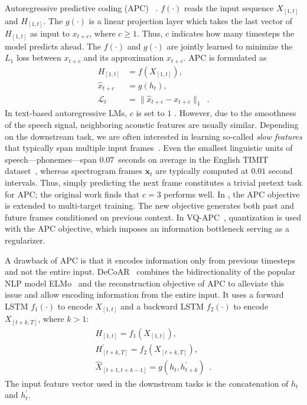 Autoregressive predictive coding (APC)~\cite{chung_unsupervised_2019,
chung_generative_2020} .
 $f(\cdot)$ reads the input sequence $X_{[1,t]}$ and  $H_{[1,t]}$.
The  $g(\cdot)$ is a linear projection layer which takes the last vector of $H_{[1,t]}$ as input to  $x_{t+c}$, where $c \geq 1$. Thus, $c$ indicates how many timesteps the model predicts ahead. The  $f(\cdot)$
and $g(\cdot)$ are jointly learned to minimize {the \ensuremath{L_1} loss between $x_{t+c}$ and its approximation $\hat{x}_{t+c}$}. APC is formulated as 
\begin{align}
    H_{[1,t]} &= f(X_{[1,t]}) , \\
    \hat{x}_{t+c} &= g(h_{t}) \label{eq:c} , \\
    \mathcal{L}_t &= \lVert \hat{x}_{t+c} - x_{t+c} \rVert_1 \enspace .
\end{align}
In text-based autoregressive LMs, $c$ is set to $1$ . However, due to the smoothness of the speech signal, neighboring acoustic features are usually similar. Depending on the downstream task, we are often interested in learning so-called \emph{slow features} that typically span multiple input frames~\cite{wiskott_slow_2002}. Even the smallest linguistic units of speech---phonemes---span $0.07$~seconds on average in the English TIMIT dataset~\cite{garofolo_timit_1993},   whereas spectrogram frames $\mathbf{x}_t$ are typically computed at $0.01$ second intervals. Thus, simply predicting the next frame constitutes a trivial pretext task for APC; the original work finds that $c=3$ performs well. 
In \cite{chung_improved_2020}, the APC objective is extended to multi-target
training. The new objective generates both past and future frames conditioned
on previous context. 
In VQ-APC~\cite{chung_vectorquantized_2020}, quantization is used with the APC
objective, which imposes an information bottleneck serving as a regularizer.

A drawback of APC is that it encodes information only from previous timesteps
and not the entire input.
DeCoAR~\cite{ling_deep_2020} combines the bidirectionality of the popular NLP model
ELMo~\cite{peters_deep_2018} and the reconstruction objective of APC to alleviate
this issue and allow encoding information from the entire input. 
It uses a forward LSTM $f_1(\cdot)$ to encode $X_{[1,t]}$ and a backward LSTM
$f_2(\cdot)$ to encode $X_{[t+k,T]}$, where $k>1$: 
\begin{gather}
    H_{[1,t]} = f_1(X_{[1,t]}), \\
    H^\prime_{[t+k,T]} = f_2(X_{[t+k,T]}), \\
    \hat{X}_{[t+1,t+k-1]} = g(h_t, h^\prime_{t+k}) \enspace .
\end{gather}
The input feature vector used in the downstream tasks is the concatenation of
$h_{t}$ and $h^\prime_{t}$. 


